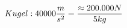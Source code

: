 \documentclass[preview]{standalone}
\begin{document}
\begin{align*}
\special{dvisvgm:raw <g id='unique000'>}Kugel: 40000 \frac{m}{s^{2}} = \frac{\approx 200.000 N}{5 kg}\special{dvisvgm:raw </g>}
\end{align*}
\end{document}
